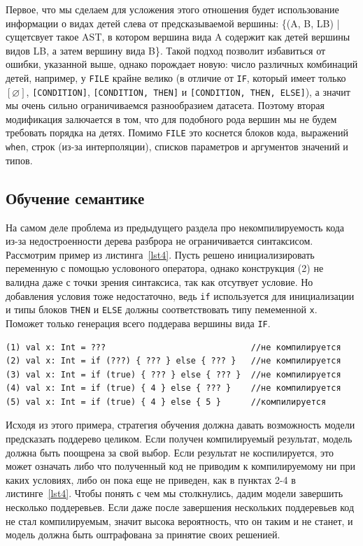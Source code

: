 \documentclass[times,specification,annotation]{itmo-student-thesis}
\begin{document}
Первое, что мы сделаем для усложения этого отношения будет использование информации о видах детей слева от предсказываемой вершины: \{(A, B, LB) | сущетсвует такое AST, в котором вершина вида A содержит как детей вершины видов LB, а затем вершину вида B\}. Такой подход позволит избавиться от ошибки, указанной выше, однако порождает новую: число различных комбинаций детей, например, у \texttt{FILE} крайне велико (в отличие от \texttt{IF}, который имеет только $[\varnothing]$, \texttt{[CONDITION]}, \texttt{[CONDITION, THEN]} и \texttt{[CONDITION, THEN, ELSE]}), а значит мы очень сильно ограничиваемся разнообразием датасета. Поэтому вторая модификация залючается в том, что для подобного рода вершин мы не будем требовать порядка на детях. Помимо \texttt{FILE} это коснется блоков кода, выражений \texttt{when}, строк (из-за интерполяции), списков параметров и аргументов значений и типов.

\subsection{Обучение семантике}\label{fit:syntax}
На самом деле проблема из предыдущего раздела про некомпилируемость кода из-за недостроенности дерева разброра не ограничивается синтаксисом. Рассмотрим пример из листинга~\ref{lst4}. Пусть решено инициализировать переменную с помощью условоного оператора, однако конструкция (2) не валидна даже с точки зрения синтаксиса, так как отсутвует условие. Но добавления условия тоже недостаточно, ведь \texttt{if} используется для инициализации и типы блоков \texttt{THEN} и \texttt{ELSE} должны соответствовать типу пемеменной \texttt{x}. Поможет только генерация всего поддерава вершины вида \texttt{IF}.

\begin{lstlisting}[float=!h,caption={Возможная последовательная генерация},label={lst4}]
(1) val x: Int = ???                             //не компилируется
(2) val x: Int = if (???) { ??? } else { ??? }   //не компилируется
(3) val x: Int = if (true) { ??? } else { ??? }  //не компилируется
(4) val x: Int = if (true) { 4 } else { ??? }    //не компилируется
(5) val x: Int = if (true) { 4 } else { 5 }      //компилируется
\end{lstlisting}

Исходя из этого примера, стратегия обучения должна давать возможность модели предсказать поддерево целиком. Если получен компилируемый результат, модель должна быть поощрена за свой выбор. Если результат не коспилируется, это может означать либо что полученный код не приводим к компилируемому ни при каких условиях, либо он пока еще не приведен, как в пунктах 2-4 в листинге~\ref{lst4}. Чтобы понять с чем мы столкнулись, дадим модели завершить несколько поддеревьев. Если даже после завершения нескольких поддеревьев код не стал компилируемым, значит высока вероятность, что он таким и не станет, и модель должна быть оштрафована за принятие своих решенией.
\end{document}
